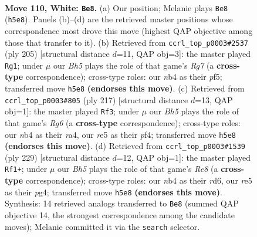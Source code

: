\documentclass[11pt]{article}
\begin{document}
\clearpage

\begin{figure}[p]\centering
\begin{subfigure}{0.46\textwidth}\centering
\resizebox{\linewidth}{!}{%
\newchessgame
\chessboard[
  setfen={8/8/5k2/4r1pB/1n6/6K1/8/8 w - - 4 110},
  showmover=false,
  pgfstyle=straightmove, color=movearrow, markmove={h5-e8}
]}
\caption{}
\end{subfigure}\hfill
\begin{subfigure}{0.46\textwidth}\centering
\resizebox{\linewidth}{!}{%
\newchessgame
\chessboard[
  setfen={8/7k/3R3P/4KP2/8/8/6r1/8 b - - 86 103},
  showmover=false,
  pgfstyle=straightmove, color=movearrow, markmove={g2-g1}
]}
\caption{}
\end{subfigure}
\\[4pt]
\begin{subfigure}{0.46\textwidth}\centering
\resizebox{\linewidth}{!}{%
\newchessgame
\chessboard[
  setfen={5k2/8/5P2/5K2/R4P2/6r1/8/8 b - - 62 109},
  showmover=false,
  pgfstyle=straightmove, color=movearrow, markmove={g3-f3}
]}
\caption{}
\end{subfigure}\hfill
\begin{subfigure}{0.46\textwidth}\centering
\resizebox{\linewidth}{!}{%
\newchessgame
\chessboard[
  setfen={8/6k1/3R4/6P1/5KP1/8/8/4r3 b - - 4 115},
  showmover=false,
  pgfstyle=straightmove, color=movearrow, markmove={e1-f1}
]}
\caption{}
\end{subfigure}
\caption{\textbf{Move 110, White: \texttt{Be8}.} (a) Our position; Melanie plays \texttt{Be8} (\texttt{h5e8}). Panels (b)--(d) are the retrieved master positions whose correspondence most drove this move (highest QAP objective among those that transfer to it). (b) Retrieved from \texttt{ccrl\_top\_p0003\#2537} (ply 205) [structural distance $d$=11, QAP obj=3]: the master played \texttt{Rg1}; under $\mu$ our \emph{Bh5} plays the role of that game's \emph{Rg7} (a \textbf{cross-type} correspondence); cross-type roles: our \emph{n}b4 as their \emph{p}f5; transferred move \texttt{h5e8} \textbf{(endorses this move)}. (c) Retrieved from \texttt{ccrl\_top\_p0003\#805} (ply 217) [structural distance $d$=13, QAP obj=1]: the master played \texttt{Rf3}; under $\mu$ our \emph{Bh5} plays the role of that game's \emph{Rg6} (a \textbf{cross-type} correspondence); cross-type roles: our \emph{n}b4 as their \emph{r}a4, our \emph{r}e5 as their \emph{p}f4; transferred move \texttt{h5e8} \textbf{(endorses this move)}. (d) Retrieved from \texttt{ccrl\_top\_p0003\#1539} (ply 229) [structural distance $d$=12, QAP obj=1]: the master played \texttt{Rf1+}; under $\mu$ our \emph{Bh5} plays the role of that game's \emph{Re8} (a \textbf{cross-type} correspondence); cross-type roles: our \emph{n}b4 as their \emph{r}d6, our \emph{r}e5 as their \emph{p}g4; transferred move \texttt{h5e8} \textbf{(endorses this move)}. Synthesis: 14 retrieved analogs transferred to \texttt{Be8} (summed QAP objective 14, the strongest correspondence among the candidate moves); Melanie committed it via the \texttt{search} selector.}
\label{fig:thought-m218}
\end{figure}
\end{document}
